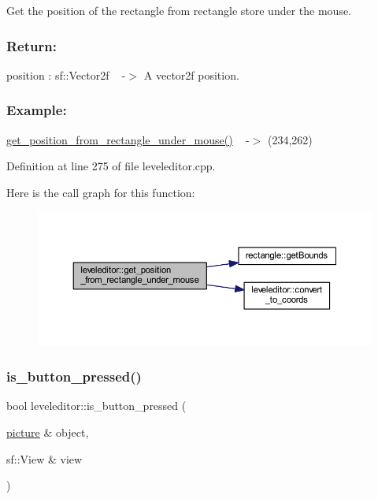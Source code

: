 Get the position of the rectangle from rectangle store under the mouse. 

\subsubsection*{Return\+: }

position \+: sf\+::\+Vector2f ~\newline
-\/$>$ A vector2f position.

\subsubsection*{Example\+: }

\hyperlink{classleveleditor_ac6bf4571731b8283feb4c20d1391fa8b}{get\+\_\+position\+\_\+from\+\_\+rectangle\+\_\+under\+\_\+mouse()} ~\newline
-\/$>$ (234,262) 

Definition at line 275 of file leveleditor.\+cpp.

Here is the call graph for this function\+:
\nopagebreak
\begin{figure}[H]
\begin{center}
\leavevmode
\includegraphics[width=350pt]{classleveleditor_ac6bf4571731b8283feb4c20d1391fa8b_cgraph}
\end{center}
\end{figure}
\mbox{\label{classleveleditor_aaa46d78a5b4630364b7b8f115b23dcff}} 
\subsubsection{\texorpdfstring{is\+\_\+button\+\_\+pressed()}{is\_button\_pressed()}}
{\footnotesize\ttfamily bool leveleditor\+::is\+\_\+button\+\_\+pressed (\begin{DoxyParamCaption}\item[{\hyperlink{classpicture}{picture} \&}]{object,  }\item[{sf\+::\+View \&}]{view }\end{DoxyParamCaption})\hspace{0.3cm}{\ttfamily [private]}}



